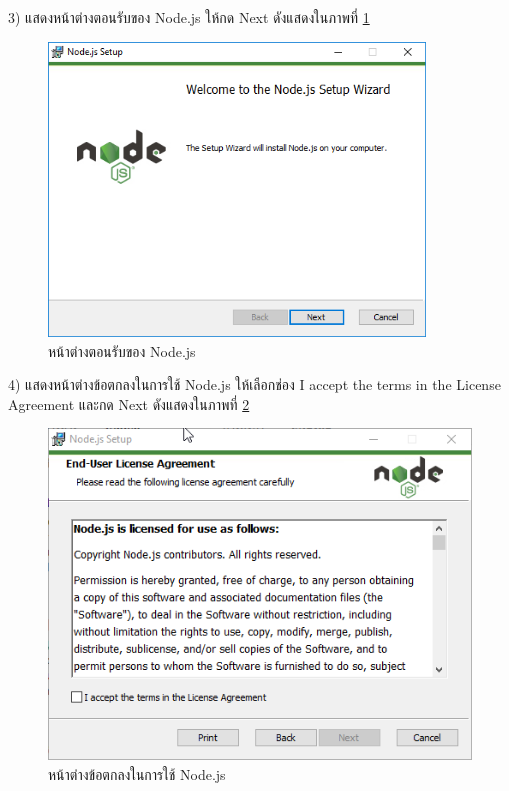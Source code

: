     3) แสดงหน้าต่างตอนรับของ Node.js ให้กด Next ดังแสดงในภาพที่ \ref{Fig:nodeInstall3}
      \begin{figure}[H]
            \centering
            \includegraphics[width=10cm]{Figures/7/3}
            \caption{หน้าต่างตอนรับของ Node.js}
            \label{Fig:nodeInstall3}
      \end{figure}

    4) แสดงหน้าต่างข้อตกลงในการใช้ Node.js ให้เลือกช่อง I accept the terms in the License Agreement และกด Next ดังแสดงในภาพที่ \ref{Fig:nodeInstall4}
      \begin{figure}[H]
            \centering
            \includegraphics[width=\columnwidth]{Figures/7/4}
            \caption{หน้าต่างข้อตกลงในการใช้ Node.js}
            \label{Fig:nodeInstall4}
      \end{figure}

